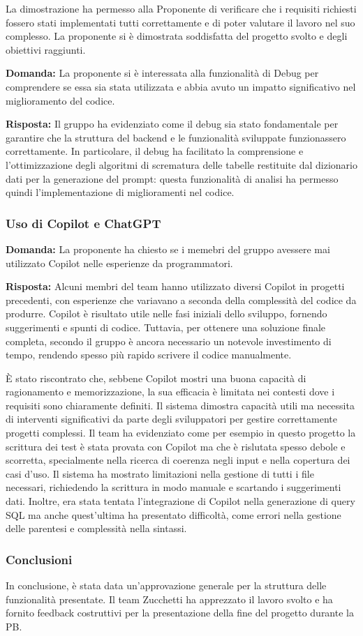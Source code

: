 \par La dimostrazione ha permesso alla Proponente di verificare che i requisiti richiesti fossero stati implementati tutti correttamente e di poter valutare il lavoro nel suo complesso. La proponente si è dimostrata soddisfatta del progetto svolto e degli obiettivi raggiunti. 
\par \textbf{Domanda:} La proponente si è interessata alla funzionalità di Debug per comprendere se essa sia stata utilizzata e abbia avuto un impatto significativo nel miglioramento del codice.

\par \textbf{Risposta:} Il gruppo ha evidenziato come il debug sia stato fondamentale per garantire che la struttura del backend e le funzionalità sviluppate funzionassero correttamente. In particolare, il debug ha facilitato la comprensione e l'ottimizzazione degli algoritmi di scrematura delle tabelle restituite dal dizionario dati per la generazione del prompt: questa funzionalità di analisi ha permesso quindi l’implementazione di miglioramenti nel codice.

\subsubsection{Uso di Copilot e ChatGPT}

\par \textbf{Domanda:} La proponente ha chiesto se i memebri del gruppo avessere mai utilizzato Copilot nelle esperienze da programmatori.

\par \textbf{Risposta:} Alcuni membri del team hanno utilizzato diversi Copilot in progetti precedenti, con esperienze che variavano a seconda della complessità del codice da produrre. Copilot è risultato utile nelle fasi iniziali dello sviluppo, fornendo suggerimenti e spunti di codice. Tuttavia, per ottenere una soluzione finale completa, secondo il gruppo è ancora necessario un notevole investimento di tempo, rendendo spesso più rapido scrivere il codice manualmente.

\par È stato riscontrato che, sebbene Copilot mostri una buona capacità di ragionamento e memorizzazione, la sua efficacia è limitata nei contesti dove i requisiti sono chiaramente definiti. Il sistema dimostra capacità utili ma necessita di interventi significativi da parte degli sviluppatori per gestire correttamente progetti complessi.
Il team ha evidenziato come per esempio in questo progetto la scrittura dei test è stata provata con Copilot ma che è rislutata spesso debole e scorretta, specialmente nella ricerca di coerenza negli input e nella copertura dei casi d'uso. Il sistema ha mostrato limitazioni nella gestione di tutti i file necessari, richiedendo la scrittura in modo manuale e scartando i suggerimenti dati. Inoltre, era stata tentata l'integrazione di Copilot nella generazione di query SQL ma anche quest'ultima ha presentato difficoltà, come errori nella gestione delle parentesi e complessità nella sintassi.

\subsubsection{Conclusioni}

\par In conclusione, è stata data un'approvazione generale per la struttura delle funzionalità presentate. Il team Zucchetti ha apprezzato il lavoro svolto e ha fornito feedback costruttivi per la presentazione della fine del progetto durante la PB.
